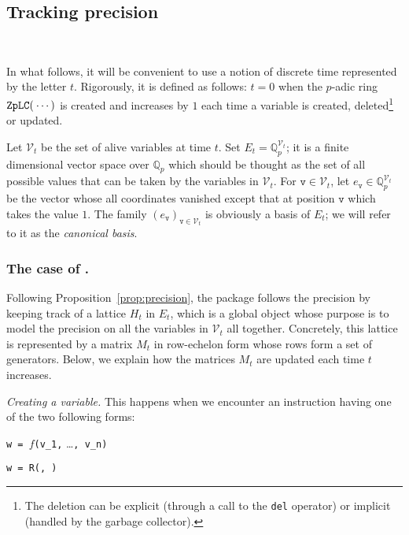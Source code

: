 \documentclass[sigconf]{acmart}
\newcommand{\Q}{\mathbb Q}
\newcommand{\Qp}{\Q_p}
\newcommand{\calV}{\mathcal{V}}
\newcommand{\ttv}{\texttt{v}\xspace}
\newcommand{\ZpLC}{\text{\rm \tt ZpLC}\xspace}
\def\todo#1{\ \!\!{\color{red} #1}}
\theoremstyle{definition}
\begin{document}
\subsection{Tracking precision}

\todo{Maybe, add a short intro.}

In what follows, it will be convenient to use a notion of discrete time 
represented by the letter $t$. Rigorously, it is defined as follows: 
$t=0$ when the $p$-adic ring $\ZpLC(\:\cdots)$ is created and increases by 
$1$ each time a variable is created, deleted\footnote{The deletion can
be explicit (through a call to the \texttt{del} operator) or implicit
(handled by the garbage collector).} or updated.

Let $\calV_t$ be the set of alive variables at time $t$. Set $E_t = 
\Qp^{\calV_t}$; it is a finite dimensional vector space over $\Qp$ which 
should be thought as the set of all possible values that can be taken by 
the variables in $\calV_t$. For $\ttv \in \calV_t$, let $e_\ttv \in
\Qp^{\calV_t}$ be the vector whose all coordinates vanished except 
that at position $\ttv$ which takes the value $1$. The family 
$(e_\ttv)_{\ttv \in \calV_t}$ is obviously a basis of $E_t$; we will 
refer to it as the \emph{canonical basis}.

\subsubsection{The case of \ZpLC.}

Following Proposition~\ref{prop:precision},
the package \ZpLC follows the precision by keeping track of a lattice
$H_t$ in $E_t$, which is a global object whose purpose is to model the 
precision on all the variables in $\calV_t$ all together.
Concretely, this lattice is represented by a matrix $M_t$ in row-echelon 
form whose rows form a set of generators.
Below, we explain how the matrices $M_t$ are updated each time
$t$ increases.

\smallskip

\noindent \textit{Creating a variable.}
%
This happens when we encounter an instruction having one of the
two following forms:

\medskip

\noindent \hspace{5mm} \makebox[2.5cm]{[Computation]\hfill\null}
\verb?w = ?$f$\verb?(v_1,? \ldots\verb?, v_n)?

\smallskip

\noindent \hspace{5mm} 
\verb?w = ?\verb?R(?\verb?, ?\verb?)?
\end{document}
